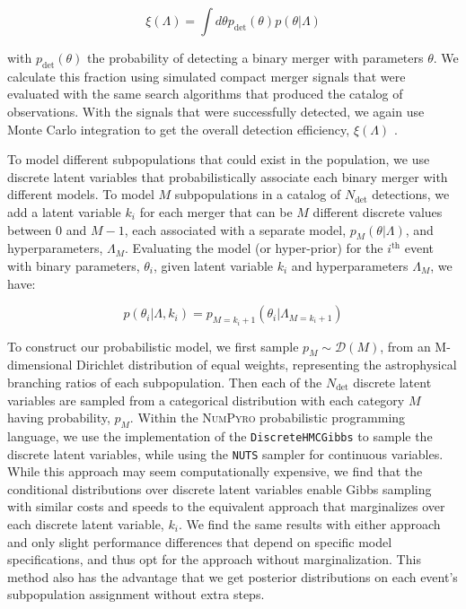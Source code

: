 \begin{equation} \label{eq:detfrac}
    \xi(\Lambda) = \int d\theta p_\mathrm{det}(\theta) p(\theta | \Lambda)
\end{equation}

\noindent with $p_\mathrm{det}(\theta)$ the probability of detecting a binary merger with parameters $\theta$. We calculate this fraction using simulated compact merger signals that were evaluated with the same search algorithms that produced the catalog of observations. With the signals that were successfully detected, we again use Monte Carlo integration to get the overall detection efficiency, $\xi(\Lambda)$ \citep{1712.00482, 1904.10879}.


To model different subpopulations that could exist in the population, we use discrete latent variables that probabilistically associate each binary merger with different models. To model $M$ subpopulations in a catalog of $N_\mathrm{det}$ detections, we add a latent variable $k_i$ for each merger that can be $M$ different discrete values between $0$ and $M-1$, each associated with a separate model, $p_{M}(\theta | \Lambda)$, and hyperparameters, $\Lambda_M$. Evaluating the model (or hyper-prior) for the $i^\mathrm{th}$ event with binary parameters, $\theta_i$, given latent variable $k_i$ and hyperparameters $\Lambda_M$, we have:

\begin{equation} \label{eq:latent}
    p(\theta_i | \Lambda, k_i) = p_{M=k_i+1}(\theta_i | \Lambda_{M=k_i+1})
\end{equation}

\noindent To construct our probabilistic model, we first sample $p_M \sim \mathcal{D}(M)$, from an M-dimensional Dirichlet distribution of equal weights, representing the astrophysical branching ratios of each subpopulation. Then each of the $N_\mathrm{det}$ discrete latent variables are sampled from a categorical distribution with each category $M$ having probability, $p_M$. Within the \textsc{NumPyro} \citep{1810.09538,1912.11554} probabilistic programming language, we use the implementation of the \texttt{DiscreteHMCGibbs} \citep{Liu1996PeskunsTA} to sample the discrete latent variables, while using the \texttt{NUTS} \citep{1111.4246} sampler for continuous variables. While this approach may seem computationally expensive, we find that the conditional distributions over discrete latent variables enable Gibbs sampling with similar costs and speeds to the equivalent approach that marginalizes over each discrete latent variable, $k_i$. We find the same results with either approach and only slight performance differences that depend on specific model specifications, and thus opt for the approach without marginalization. This method also has the advantage that we get posterior distributions on each event's subpopulation assignment without extra steps.

